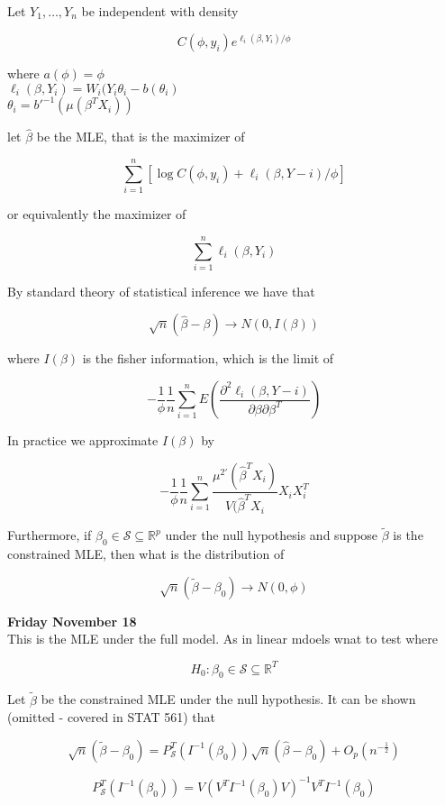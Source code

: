 \documentclass[11pt,fleqn]{book} %
\begin{document}
Let $Y_1, \dots, Y_n$ be independent with density

		$$C(\phi, y_i) e^{\ell_i(\beta, Y_i)/\phi} $$

where $a(\phi) = \phi$\\
$\ell_i(\beta, Y_i) = W_i(Y_i\theta_i - b(\theta_i)$\\
$\theta_i = b'^{-1}(\mu(\beta^T X_i))$

let $\hat{\beta}$ be the MLE, that is the maximizer of 

		$$\sum^n_{i=1} \left[\log C(\phi, y_i) + \ell_i(\beta, Y-i)/\phi \right] $$

or equivalently the maximizer of 

		$$\sum^n_{i=1} \ell_i(\beta, Y_i) $$

By standard theory of statistical inference we have that

		$$\sqrt{n}(\hat{\beta} - \beta) \rightarrow N(0, I(\beta)) $$


where $I(\beta)$ is the fisher information, which is the limit of

		$$-\frac{1}{\phi} \frac{1}{n}\sum^n_{i=1}E\left(\frac{\partial^2 \ell_i(\beta, Y-i)}{\partial \beta \partial \beta^T}\right) $$		

In practice we approximate $I(\beta)$ by

		$$-\frac{1}{\phi} \frac{1}{n}\sum^n_{i=1} \frac{\mu^{2'} (\hat{\beta}^T X_i)}{V(\hat{\beta}^T X_i} X_i X_i^T $$


Furthermore, if $\beta_0 \in \mathcal{S} \subseteq \mathbb{R}^p$ under the null hypothesis and suppose $\tilde{\beta}$ is the constrained MLE, then what is the distribution of 

		$$ \sqrt{n}(\tilde{\beta} - \beta_0) \rightarrow N(0, \phi)$$



\textbf{Friday November 18}\\


This is the MLE under the full model. As in linear mdoels wnat to test where 

		$$H_0: \beta_0 \in \mathcal{S} \subseteq \mathbb{R}^T $$

Let $\tilde{\beta}$ be the constrained MLE under the null hypothesis. It can be shown (omitted - covered in STAT 561) that

		$$\sqrt{n}(\tilde{\beta} - \beta_0) = P_{\mathcal{S}}^T(I^{-1}(\beta_0))\sqrt{n}(\hat{\beta} - \beta_0) + O_p(n^{-\frac{1}{2}}) $$

		$$P_{\mathcal{S}}^T(I^{-1}(\beta_0)) = V(V^T I^{-1}(\beta_0)V)^{-1}V^T I^{-1}(\beta_0) $$
\end{document}
